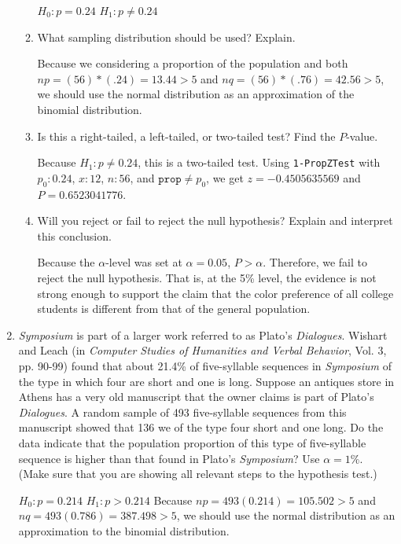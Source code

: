 \begin{enumerate}
\begin{enumerate}
	{\answer $H_0 : p = 0.24$ 
	$H_1: p \neq 0.24$} 
	
	
	\item What sampling distribution should be used? Explain. 
	
	{\answer Because we considering a proportion of the population and both $np = (56)*(.24) = 13.44 > 5$ and $nq = (56)*(.76) = 42.56 >5$, we should use the normal distribution as an approximation of the binomial distribution.} 
	
	\item Is this a right-tailed, a left-tailed, or two-tailed test? Find the $P$-value. 
	
	{\answer Because $H_1: p \neq 0.24$, this is a two-tailed test. 
	Using \texttt{1-PropZTest} with $p_0: 0.24$, $x: 12$, $n:56$, and $\texttt{prop} \neq p_0$, we get $z=-0.4505635569$ and $P = 0.6523041776$.} 
	 
	 
	\item Will you reject or fail to reject the null hypothesis? Explain and interpret this conclusion. 
	
	{\answer Because the $\alpha$-level was set at $\alpha = 0.05$, $P > \alpha$. Therefore, we fail to reject the null hypothesis. That is, at the 5\% level, the evidence is not strong enough to support the claim that the color preference of all college students is different from that of the general population.} 
	 
	\end{enumerate}

\newpage

\item {\em Symposium} is part of a larger work referred to as Plato's {\em Dialogues}. Wishart and Leach (in {\em Computer Studies of Humanities and Verbal Behavior}, Vol. 3, pp. 90-99) found that about 21.4\% of five-syllable sequences in {\em Symposium} of the type in which four are short and one is long. Suppose an antiques store in Athens has a very old manuscript that the owner claims is part of Plato's {\em Dialogues}. A random sample of 493 five-syllable sequences from this manuscript showed that 136 we of the type four short and one long. Do the data indicate that the population proportion of this type of five-syllable sequence is higher than that found in Plato's {\em Symposium}? Use $\alpha = 1\%$. 
(Make sure that you are showing all relevant steps to the hypothesis test.) 

{\answer $H_0: p = 0.214$ 
$H_1: p > 0.214$ 
Because $np = 493(0.214) = 105.502 >5$ and $nq = 493(0.786)=387.498 >5$, we should use the normal distribution as an approximation to the binomial distribution. 

}
\end{enumerate}
